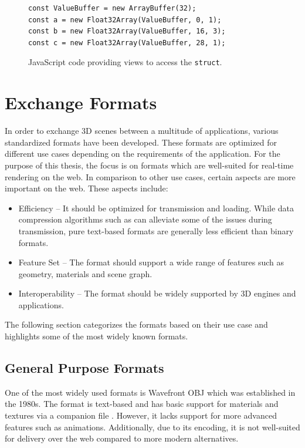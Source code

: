 \begin{figure}[H]
  \begin{lstlisting}[style=JavaScript]
const ValueBuffer = new ArrayBuffer(32);
const a = new Float32Array(ValueBuffer, 0, 1);
const b = new Float32Array(ValueBuffer, 16, 3);
const c = new Float32Array(ValueBuffer, 28, 1);
  \end{lstlisting}
  \caption{JavaScript code providing views to access the \texttt{struct}.}
  \label{code:memoryAlignmentJs}
\end{figure}

\section{Exchange Formats}

In order to exchange 3D scenes between a multitude of applications, various standardized formats have been developed. These formats are optimized for different use cases depending on the requirements of the application. For the purpose of this thesis, the focus is on formats which are well-suited for real-time rendering on the web. In comparison to other use cases, certain aspects are more important on the web. These aspects include:

\begin{itemize}
    \item{Efficiency} – It should be optimized for transmission and loading. While data compression algorithms such as  can alleviate some of the issues during transmission, pure text-based formats are generally less efficient than binary formats.
    \item{Feature Set} – The format should support a wide range of features such as geometry, materials and scene graph.
    \item{Interoperability} – The format should be widely supported by 3D engines and applications.
\end{itemize}

The following section categorizes the formats based on their use case and highlights some of the most widely known formats.

\subsection*{General Purpose Formats}

One of the most widely used formats is Wavefront \gls{OBJ} which was established in the 1980s. The format is text-based and has basic support for materials and textures via a companion file . However, it lacks support for more advanced features such as animations. Additionally, due to its encoding, it is not well-suited for delivery over the web compared to more modern alternatives.

